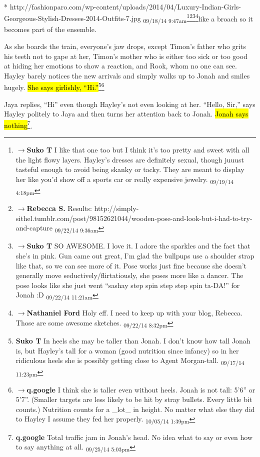 {* http://fashionparo.com/wp-content/uploads/2014/04/Luxury-Indian-Girls-Georgeous-Stylish-Dresses-2014-Outfits-7.jpg \textsubscript{09/18/14 9:47am}}\footnote{$\rightarrow$\textbf{Suko T }I like that one too but I think it's too pretty and sweet with all the light flowy layers.  Hayley's dresses are definitely sexual, though juuust tasteful enough to avoid being skanky or tacky.  They are meant to display her like you'd show off a sports car or really expensive jewelry. \textsubscript{09/19/14 4:18pm}}\footnote{$\rightarrow$\textbf{Rebecca S. }Results: http://simply-sithel.tumblr.com/post/98152621044/wooden-pose-and-look-but-i-had-to-try-and-capture \textsubscript{09/22/14 9:36am}}\footnote{$\rightarrow$\textbf{Suko T }SO AWESOME.  I love it.  I adore the sparkles and the fact that she's in pink.  Gun came out great, I'm glad the bullpups use a shoulder strap like that, so we can see more of it.  Pose works just fine because she doesn't generally move seductively/flirtatiously, she poses more like a dancer.  The pose looks like she just went ``sashay step spin step step spin ta-DA!'' for Jonah :D \textsubscript{09/22/14 11:21am}}\footnote{$\rightarrow$\textbf{Nathaniel Ford }Holy eff. I need to keep up with your blog, Rebecca. Those are some awesome sketches. \textsubscript{09/22/14 8:32pm}}like a broach so it becomes part of the ensemble.



As she boards the train, everyone's jaw drops, except Timon's father who grits his teeth not to gape at her, Timon's mother who is either too sick or too good at hiding her emotions to show a reaction, and Rook, whom no one can see.  Hayley barely notices the new arrivals and simply walks up to Jonah and smiles hugely. \hl{She says girlishly, ``Hi.''}\footnote{\textbf{Suko T }In heels she may be taller than Jonah.  I don't know how tall Jonah is, but Hayley's tall for a woman (good nutrition since infancy) so in her ridiculous heels she is possibly getting close to Agent Morgan-tall. \textsubscript{09/17/14 11:23pm}}\footnote{$\rightarrow$\textbf{q.google }I think she is taller even without heels.  Jonah is not tall: 5'6'' or 5'7''.  (Smaller targets are less likely to be hit by stray bullets.  Every little bit counts.)  Nutrition counts for a \_lot\_ in height.  No matter what else they did to Hayley I assume they fed her properly. \textsubscript{10/05/14 1:39pm}}

Jaya replies, ``Hi'' even though Hayley's not even looking at her.  ``Hello, Sir,'' says Hayley politely to Jaya and then turns her attention back to Jonah.  \hl{Jonah says nothing}\footnote{\textbf{q.google }Total traffic jam in Jonah's head.  No idea what to say or even how to say anything at all. \textsubscript{09/25/14 5:03pm}}.

